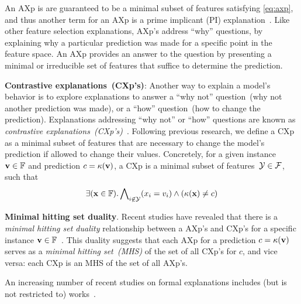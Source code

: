 An AXp is are guaranteed to be a minimal subset of features satisfying \autoref{eq:axp},
and thus another term for an AXp is a prime implicant (PI) explanation~\cite{inms-aaai19}.
%
Like other feature selection explanations, AXp's address ``why'' questions,
by explaining why a particular prediction was made for a specific point 
in the feature space.
%
An AXp provides an answer to the question by presenting a minimal or irreducible 
set of features that suffice to determine the prediction.

\textbf{Contrastive explanations~(CXp's)}: 
Another way to explain a model's behavior is to explore explanations to
answer a ``why not'' question~(why not another prediction was made), 
or a ``how'' question~(how to change the prediction).
%
Explanations addressing ``why not'' or ``how'' questions are known as
\emph{contrastive explanations~(CXp's)}~\cite{miller-aij19,inams-aiia20,msi-aaai22}. 
%
Following previous research, we define a CXp as a minimal subset of features
that are necessary to change the model's prediction if allowed to change their values.
%
Concretely, for a given instance $\mathbf{v} \in \mathbb{F}$ and 
prediction $c = \kappa(\mathbf{v})$, a CXp is a 
minimal subset of features~${\mathcal{Y}} \in {\mathcal{F}}$, such that
\begin{equation}\label{eq:cxp}
	\exists(\mathbf{x}\in\mathbb{F}).\bigwedge\nolimits_{i\not\in{\mathcal{Y}}}(x_i=v_i)\land(\kappa(\mathbf{x})\not=c)
\end{equation}

\textbf{Minimal hitting set duality}. 
%
Recent studies have revealed that there is a \emph{minimal hitting set duality} relationship
between a AXp's and CXp's for a specific instance $\mathbf{v} \in \mathbb{F}$~\cite{inams-aiia20,reiter-aij87}.
%
This duality suggests that each AXp for a prediction $c = \kappa(\mathbf{v})$ 
serves as a \emph{minimal hitting set~(MHS)} of the set of all CXp's for $c$,
and vice versa: each CXp is an MHS of the set of all AXp's.

An increasing number of recent studies on formal explanations includes (but is not restricted to)
works~\cite{msgcin-icml21,barcelo-nips21,kutyniok-jair21,darwiche-jair21,kwiatkowska-ijcai21,mazure-cikm21,tan-nips21,rubin-aaai22,msi-aaai22,an-ijcai22,leite-kr22,barcelo-nips22}.
